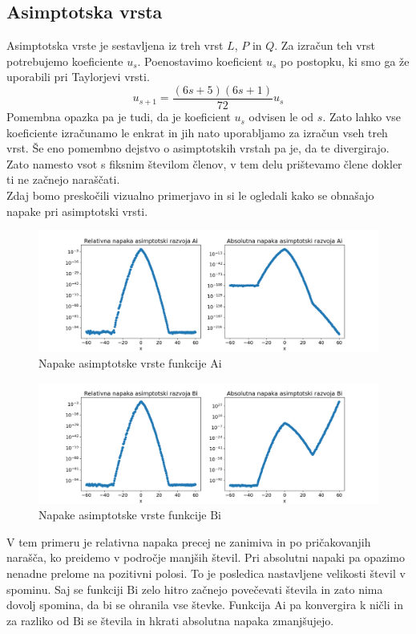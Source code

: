 \documentclass{article}
\newcommand{\Ai}{\mathrm{Ai}}
\newcommand{\Bi}{\mathrm{Bi}}
\begin{document}
\subsection{Asimptotska vrsta}
Asimptotska vrste je sestavljena iz treh vrst $L$, $P$ in $Q$. Za izračun teh vrst potrebujemo koeficiente $u_s$. Poenostavimo koeficient $u_s$ po postopku, ki smo ga že uporabili pri Taylorjevi vrsti.
\begin{equation*}
    u_{s+1} = \frac{(6s + 5)(6s + 1)}{72} u_s
\end{equation*}
Pomembna opazka pa je tudi, da je koeficient $u_s$ odvisen le od $s$. Zato lahko vse koeficiente izračunamo le enkrat in jih nato uporabljamo za izračun vseh treh vrst. Še eno pomembno dejstvo o asimptotskih vrstah pa je, da te divergirajo. Zato namesto vsot s fiksnim številom členov, v tem delu prištevamo člene dokler ti ne začnejo naraščati. \\

Zdaj bomo preskočili vizualno primerjavo in si le ogledali kako se obnašajo napake pri asimptotski vrsti.
\begin{figure}[H]
    \centering
    \includegraphics[width=1.1\textwidth]{Ai_asimptotski_razvoj.png}
    \caption{Napake asimptotske vrste funkcije $\Ai$}
\end{figure}
\begin{figure}[H]
    \centering
    \includegraphics[width=1.1\textwidth]{Bi_asimptotski_razvoj.png}
    \caption{Napake asimptotske vrste funkcije $\Bi$}
\end{figure}
V tem primeru je relativna napaka precej ne zanimiva in po pričakovanjih narašča, ko preidemo v področje manjših števil. Pri absolutni napaki pa opazimo nenadne prelome na pozitivni polosi. To je posledica nastavljene velikosti števil v spominu. Saj se funkciji $\Bi$ zelo hitro začnejo povečevati števila in zato nima dovolj spomina, da bi se ohranila vse števke. Funkcija $\Ai$ pa konvergira k ničli in za razliko od $\Bi$ se števila in hkrati absolutna napaka zmanjšujejo.
\end{document}
